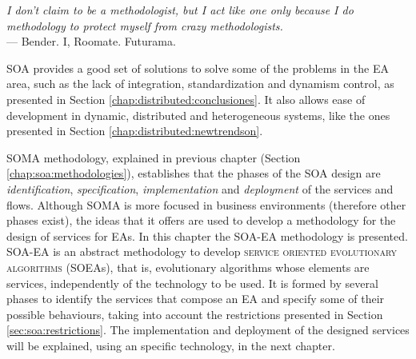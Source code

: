 \label{chap:soaea}


\begin{flushright}{\slshape
    I don't claim to be a methodologist, but I act like one only 
    because I do methodology to protect myself from crazy methodologists. } \\ \medskip
    --- {Bender. I, Roomate. Futurama.}
\end{flushright}

\minitoc\mtcskip
\vfill
\lettrine{S}{OA} provides a good set of solutions to solve some of the
problems in the EA area, such as the lack of integration,
standardization and dynamism control, as presented in Section \ref{chap:distributed:conclusiones}. It also allows ease of
development in dynamic, distributed and heterogeneous systems, like the ones presented in Section \ref{chap:distributed:newtrendson}. %


SOMA methodology, explained in previous chapter (Section \ref{chap:soa:methodologies}), establishes that the phases of the SOA design are {\em identification}, {\em specification}, {\em implementation} and {\em deployment} of the services and flows. Although SOMA is more focused in business environments (therefore other phases exist), the ideas that it offers are used to develop a methodology for the design of services for EAs. In this chapter the SOA-EA methodology is presented. SOA-EA is an abstract methodology to develop \textsc{service oriented evolutionary algorithms} (SOEAs), that is, evolutionary algorithms whose elements are services, independently of the technology to be used. It is formed by several phases to identify the services that compose an EA and specify some of their possible behaviours, taking into account the restrictions presented in Section \ref{sec:soa:restrictions}. The implementation and deployment of the designed services will be explained, using an specific technology, in the next chapter.


